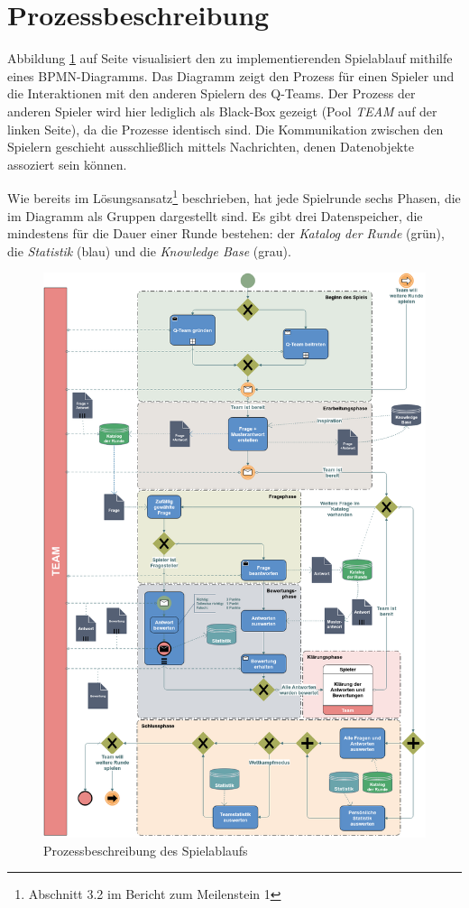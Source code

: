 \documentclass[a4paper,11pt,listof=numbered,glossary=totoc,parskip=half,toc=bib]{scrreprt}
\begin{document}
	\section{Prozessbeschreibung}
	
	Abbildung \ref{fig:bpmn} auf Seite \pageref{fig:bpmn} visualisiert den zu implementierenden Spielablauf mithilfe eines BPMN-Diagramms. Das Diagramm zeigt den Prozess für einen Spieler und die Interaktionen mit den anderen Spielern des Q-Teams. Der Prozess der anderen Spieler wird hier lediglich als Black-Box gezeigt (Pool \textit{TEAM} auf der linken Seite), da die Prozesse identisch sind. Die Kommunikation zwischen den Spielern geschieht ausschließlich mittels Nachrichten, denen Datenobjekte assoziert sein können.
	
	Wie bereits im Lösungsansatz\footnote{Abschnitt 3.2 im Bericht zum Meilenstein 1} beschrieben, hat jede Spielrunde sechs Phasen, die im Diagramm als Gruppen dargestellt sind. Es gibt drei Datenspeicher, die mindestens für die Dauer einer Runde bestehen: der \textit{Katalog der Runde} (grün), die \textit{Statistik} (blau) und die \textit{Knowledge Base} (grau).
	
	\begin{figure}
		\centering
		\includegraphics[width=\textwidth]{bpmn.png}
		\caption{Prozessbeschreibung des Spielablaufs}
		\label{fig:bpmn}
	\end{figure}	 
\end{document}
